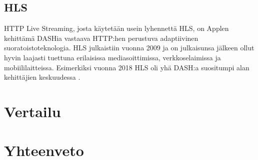 \documentclass[finnish, 12pt, a4paper, elec, utf8, a-1b, online]{aaltothesis}
\begin{document}
\noindent

\subsection*{HLS}

HTTP Live Streaming, josta käytetään usein lyhennettä HLS, on Applen kehittämä DASHia vastaava HTTP:hen perustuva adaptiivinen suoratoistoteknologia. HLS julkaistiin vuonna 2009 ja on julkaisunsa jälkeen ollut hyvin laajasti tuettuna erilaisissa mediasoittimissa, verkkoselaimissa ja mobiililaitteissa. Esimerkiksi vuonna 2018 HLS oli yhä DASH:a suositumpi alan kehittäjien keskuudessa \cite{Bitmovin}.

\noindent

\clearpage


\section{Vertailu}


\clearpage

\section{Yhteenveto}


\clearpage
\end{document}
